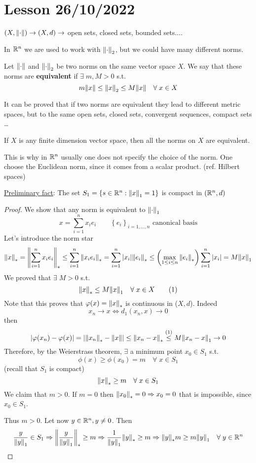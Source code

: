 \section{Lesson 26/10/2022}
\((X, \norm{\cdot}) \to (X, d) \to \) open sets, closed sets, bounded sets....

In \(\mathbb{R}^n\) we are used to work with \(\norm{\cdot}_2\), but we could have many different norms.
\begin{definition}
    Let \(\norm{\cdot}\) and \(\norm{\cdot}_2\) be two norms on the same vector space \(X\). We say that these norms are \textbf{equivalent} if \(\exists \; m, M >0\) s.t. 
    \[
        m\norm{x} \leq \norm{x}_2 \leq M\norm{x} \quad \forall\; x \in X
    \]
\end{definition}
It can be proved that if two norms are equivalent they lead to different metric spaces, but to the same open sets, closed sets, convergent sequences, compact sets \dots
\begin{theorem}
    If \(X\) is any finite dimension vector space, then all the norms on \(X\) are equivalent.
\end{theorem}
\begin{remark}
    This is why in \(\mathbb{R}^n\) usually one does not specify the choice of the norm. One choose the Euclidean norm, since it comes from a scalar product. (ref. Hilbert spaces)
\end{remark}
\underline{Preliminary fact}: The set \(S_1 = \left\{ s \in \mathbb{R}^n : \norm{x}_1  = 1\right\}\) is compact in \((\mathbb{R}^n, d)\)
\begin{proof}
    We show that any norm is equivalent to \(\norm{\cdot}_1\)
    \[
        x = \sum_{i=1}^n x_i e_i \qquad \left\{ e_i \right\}_{i= 1,\ldots, n} \mbox{ canonical basis}
    \]
    Let's introduce the norm star 
    \[
        \norm{x}_* = \norm{\sum_{i=1}^n x_i e_i}_* 
        \leq \sum_{i=1}^n \norm{x_i e_i}_* = \sum_{i=1}^n \abs{x_i} \norm{e_i}_* 
        \leq \left(\max_{1 \leq i \leq n} \norm{e_i}_*\right) \sum_{i=1}^n \abs{x_i}
        = M \norm{x}_1
    \]
    We proved that \(\exists \; M> 0\) s.t.
    \[
        \norm{x}_* \leq M \norm{x}_1 \quad \forall \; x \in X \tag{1}
    \]
    Note that this proves that \(\varphi(x) = \norm{x}_*\) is continuous in (\(X, d\)). Indeed 
    \[
        x_n \to x \Leftrightarrow d_1(x_n, x) \to 0
    \]
    then 
    \[
        \abs{\varphi(x_n) - \varphi(x)} = \abs{\norm{x_n}_* -\norm{x}} \leq \norm{x_n - x}_* 
        \overset{(1)}{\leq} M\norm{x_n - x}_1 \to 0
    \]
    Therefore, by the Weierstrass theorem, \(\exists\) a minimum point \(x_0 \in S_1\) s.t. 
    \[
        \phi(x) \geq \phi(x_0) = m \quad \forall\; x \in S_1
    \]
    (recall that \(S_1\) is compact)
    \[
        \norm{x}_* \geq m \quad \forall \; x \in S_1
    \]
    We claim that \(m>0\). If \(m=0\) then \(\norm{x_0}_* = 0 \Rightarrow x_0  = 0\) that is impossible, since \(x_0 \in S_1\).

    Thus \(m>0\). Let now \(y \in \mathbb{R}^n, y \neq 0\). Then 
    \[
        \frac{y}{\norm{y}_1} \in S_1 
        \Rightarrow \norm{\frac{y}{\norm{y}_1}}_* \geq m 
        \Rightarrow \frac{1}{\norm{y}_1} \norm{y}_* \geq m 
        \Rightarrow \norm{y}_*m\geq m \norm{y}_1 \quad \forall \; y \in \mathbb{R}^n 
    \]
\end{proof}
